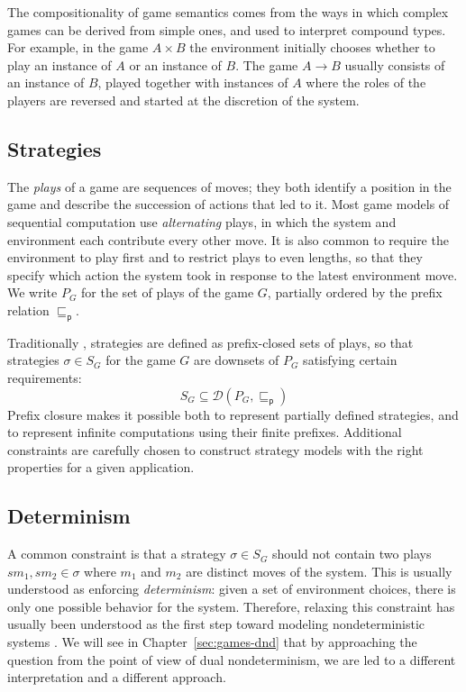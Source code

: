 \documentclass[11pt,oneside]{book}
\theoremstyle{definition}
\newcommand{\kw}[1]{\ensuremath{ \mathsf{#1} }}
\newcommand{\pref}{\sqsubseteq_\kw{p}}  %
\begin{document}
The compositionality of game semantics
comes from the ways in which complex games can be derived from simple ones,
and used to interpret compound types.
For example,
in the game $A \times B$
the environment initially chooses whether to play
an instance of $A$ or an instance of $B$.
The game $A \rightarrow B$ usually consists of
an instance of $B$, played
together with instances of $A$
where the roles of the players are reversed and
started at the discretion of the system.


\subsection{Strategies} \label{sec:bg:strat} %

The \emph{plays} of a game are sequences of moves;
they both identify a position in the game
and describe the succession of actions that led to it.
Most game models of sequential computation
use \emph{alternating} plays,
in which
the system and environment each contribute
every other move.
It is also common to require the environment to play first
and to restrict plays to even lengths,
so that they specify which action the system took
in response to the latest environment move.
We write $P_G$ for the set of plays of the game $G$,
partially ordered by the prefix relation $\pref$.

Traditionally \citep{gamesem99},
strategies are defined as
prefix-closed sets of plays,
so that strategies $\sigma \in S_G$
for the game $G$ are downsets of $P_G$
satisfying certain requirements:
\[
    S_G \subseteq
    \mathcal{D}(P_G, {\pref})
\]
Prefix closure makes it possible both
to represent partially defined strategies,
and to represent infinite computations
using their finite prefixes.
Additional constraints
are carefully chosen to construct
strategy models
with the right properties
for a given application.

\subsection{Determinism}

A common constraint is that a strategy $\sigma \in S_G$
should not contain two plays $s m_1, s m_2 \in \sigma$
where $m_1$ and $m_2$ are distinct moves of the system.
This is usually understood as
enforcing \emph{determinism}:
given a set of environment choices,
there is only one possible behavior for the system.
Therefore,
relaxing this constraint has usually been understood
as the first step toward modeling nondeterministic systems
\citep{gsfnd}.
We will see in Chapter~\ref{sec:games-dnd}
that by approaching the question
from the point of view of dual nondeterminism,
we are led to a different interpretation and a different approach.
\end{document}
